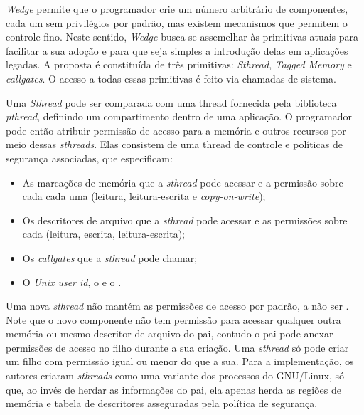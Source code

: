 \emph{Wedge} permite que o programador crie um número arbitrário de
componentes, cada um sem privilégios por padrão, mas existem mecanismos que
permitem o controle fino. Neste sentido, \emph{Wedge} busca se assemelhar às
primitivas atuais para facilitar a sua adoção e para que seja simples a
introdução delas em aplicações legadas. A proposta é constituída de três
primitivas: \emph{Sthread}, \emph{Tagged Memory} e \emph{callgates}. O
acesso a todas essas primitivas é feito via chamadas de sistema.

Uma \emph{Sthread} pode ser comparada com uma thread fornecida pela biblioteca
\textit{pthread}, definindo um compartimento dentro de uma
aplicação. O programador pode então atribuir permissão de acesso para a memória
e outros recursos por meio dessas \emph{sthreads}. Elas consistem de uma
thread de controle e políticas de segurança associadas, que especificam:

\begin{itemize}
	\item As marcações de memória que a \emph{sthread} pode acessar e a permissão
				sobre cada cada uma (leitura, leitura-escrita e \textit{copy-on-write});
	\item Os descritores de arquivo que a \emph{sthread} pode acessar e as
				permissões sobre cada (leitura, escrita, leitura-escrita);
	\item Os \emph{callgates} que a \emph{sthread} pode chamar;
	\item O \emph{Unix user id}, o  e o .
\end{itemize}

Uma nova \emph{sthread} não mantém as permissões de acesso por padrão, a não
ser . Note que o
novo componente não tem permissão para acessar qualquer outra memória ou mesmo
descritor de arquivo do pai, contudo o pai pode anexar permissões de acesso no
filho durante a sua criação. Uma \emph{sthread} só pode criar um filho com
permissão igual ou menor do que a sua. Para a implementação, os autores criaram
\emph{sthreads} como uma variante dos processos do GNU/Linux, só que, ao invés
de herdar as informações do pai, ela apenas herda as regiões de memória e tabela
de descritores asseguradas pela política de segurança.



